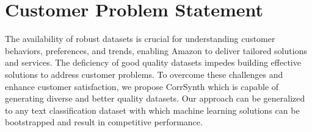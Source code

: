 \section{Customer Problem Statement}
The availability of robust datasets is crucial for understanding customer behaviors, preferences, and trends, enabling Amazon to deliver tailored solutions and services. The deficiency of good quality datasets impedes building effective solutions to address customer problems. To overcome these challenges and enhance customer satisfaction, we propose CorrSynth which is capable of generating diverse and better quality datasets. Our approach can be generalized to any text classification dataset with which machine learning solutions can be bootstrapped and result in competitive performance.